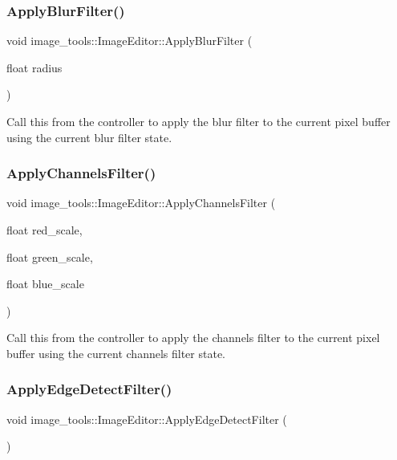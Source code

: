 \subsubsection{\texorpdfstring{Apply\+Blur\+Filter()}{ApplyBlurFilter()}}
{\footnotesize\ttfamily void image\+\_\+tools\+::\+Image\+Editor\+::\+Apply\+Blur\+Filter (\begin{DoxyParamCaption}\item[{float}]{radius }\end{DoxyParamCaption})}

Call this from the controller to apply the blur filter to the current pixel buffer using the current blur filter state. \mbox{\label{classimage__tools_1_1ImageEditor_ad0cc13d670d3e4d96ff79796568fd9a6}} 
\subsubsection{\texorpdfstring{Apply\+Channels\+Filter()}{ApplyChannelsFilter()}}
{\footnotesize\ttfamily void image\+\_\+tools\+::\+Image\+Editor\+::\+Apply\+Channels\+Filter (\begin{DoxyParamCaption}\item[{float}]{red\+\_\+scale,  }\item[{float}]{green\+\_\+scale,  }\item[{float}]{blue\+\_\+scale }\end{DoxyParamCaption})}

Call this from the controller to apply the channels filter to the current pixel buffer using the current channels filter state. \mbox{\label{classimage__tools_1_1ImageEditor_a8fd57eb520b53b60d9ed3c06fdef3311}} 
\subsubsection{\texorpdfstring{Apply\+Edge\+Detect\+Filter()}{ApplyEdgeDetectFilter()}}
{\footnotesize\ttfamily void image\+\_\+tools\+::\+Image\+Editor\+::\+Apply\+Edge\+Detect\+Filter (\begin{DoxyParamCaption}{ }\end{DoxyParamCaption})}

